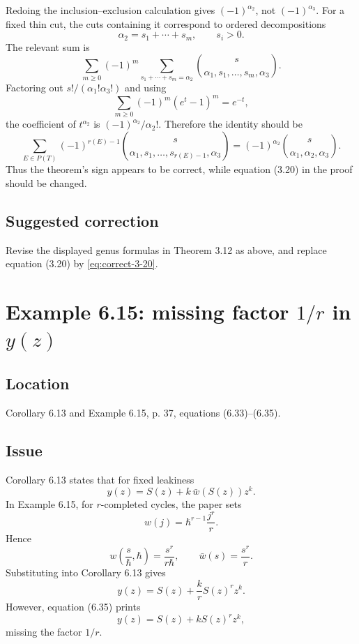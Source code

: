 \documentclass[11pt]{article}
\begin{document}
Redoing the inclusion--exclusion calculation gives $(-1)^{\alpha_2}$, not $(-1)^{\alpha_3}$.  For a fixed thin cut, the cuts containing it correspond to ordered decompositions
\[
   \alpha_2=s_1+\cdots+s_m,
   \qquad s_i>0.
\]
The relevant sum is
\[
   \sum_{m\geq 0}(-1)^m
   \sum_{s_1+\cdots+s_m=\alpha_2}
   \binom{s}{\alpha_1,s_1,\ldots,s_m,\alpha_3}.
\]
Factoring out $s!/(\alpha_1!\alpha_3!)$ and using
\[
   \sum_{m\geq 0}(-1)^m(e^t-1)^m=e^{-t},
\]
the coefficient of $t^{\alpha_2}$ is $(-1)^{\alpha_2}/\alpha_2!$.  Therefore the identity should be
\begin{equation}\label{eq:correct-3-20}
   \sum_{E\in P(T)}(-1)^{r(E)-1}
     \binom{s}{\alpha_1,s_1,\ldots,s_{r(E)-1},\alpha_3}
   =(-1)^{\alpha_2}\binom{s}{\alpha_1,\alpha_2,\alpha_3}.
\end{equation}
Thus the theorem's sign appears to be correct, while equation (3.20) in the proof should be changed.

\subsection*{Suggested correction}
Revise the displayed genus formulas in Theorem 3.12 as above, and replace equation (3.20) by \eqref{eq:correct-3-20}.

\section{Example 6.15: missing factor $1/r$ in $y(z)$}

\subsection*{Location}
Corollary 6.13 and Example 6.15, p. 37, equations (6.33)--(6.35).

\subsection*{Issue}
Corollary 6.13 states that for fixed leakiness
\[
   y(z)=S(z)+k\,\bar w(S(z))z^k.
\]
In Example 6.15, for $r$-completed cycles, the paper sets
\[
   w(j)=\hbar^{r-1}\frac{j^r}{r}.
\]
Hence
\[
   w\left(\frac{s}{\hbar},\hbar\right)=\frac{s^r}{r\hbar},
   \qquad
   \bar w(s)=\frac{s^r}{r}.
\]
Substituting into Corollary 6.13 gives
\begin{equation}\label{eq:y-correct}
   y(z)=S(z)+\frac{k}{r}S(z)^r z^k.
\end{equation}
However, equation (6.35) prints
\[
   y(z)=S(z)+kS(z)^r z^k,
\]
missing the factor $1/r$.
\end{document}
